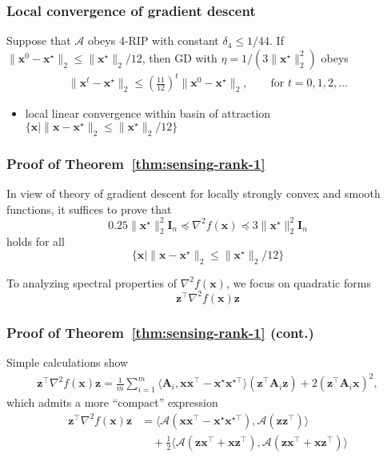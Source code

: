 \documentclass[compress,
mathserif,wide,%
]{beamer}
\begin{document}
\begin{frame}
	\frametitle{Local convergence of gradient descent}
	
	\begin{theorem}\label{thm:sensing-rank-1}
		Suppose that $\mathcal{A}$ obeys 4-RIP with constant $\delta_{4} \leq 1 /44$. If $\| \bm{x}^0 - \bm{x}^\star \|_{2} \leq \|\bm{x}^\star\|_{2} / 12$, then GD with $\eta = 1 / (3 \|\bm{x}^\star\|_{2}^{2})$ obeys
		\begin{align*}
			\| \bm{x}^t - \bm{x}^\star \|_2 \leq (\tfrac{11}{12})^t \| \bm{x}^0 - \bm{x}^\star \|_2, \qquad \text{for }t=0,1,2,\ldots
		\end{align*}
	\end{theorem}

	\vfill
	\begin{itemize}
		\item local linear convergence within basin of attraction $\{\bm{x} \mid \| \bm{x} - \bm{x}^\star \|_{2} \leq \|\bm{x}^\star\|_{2} / 12\}$
	\end{itemize}
\end{frame}

\begin{frame}
	\frametitle{Proof of Theorem~\ref{thm:sensing-rank-1}}
	In view of theory of gradient descent for locally strongly convex and smooth functions, it suffices to prove that 
	\[
		0.25 \|\bm{x}^\star\|_{2}^{2} \bm{I}_{n} \preceq \nabla^2 f (\bm{x}) \preceq 3 \|\bm{x}^\star\|_{2}^{2} \bm{I}_{n}
	\]
	holds for all 
	\[
	\{\bm{x} \mid \| \bm{x} - \bm{x}^\star \|_{2} \leq \|\bm{x}^\star\|_{2} / 12\}
	\]

	To analyzing spectral properties of $\nabla^2 f (\bm{x})$, we focus on quadratic forms
	\[
	\bm{z}^\top  \nabla^2 f (\bm{x}) \bm{z} 
	\]
\end{frame}

\begin{frame}
	\frametitle{Proof of Theorem~\ref{thm:sensing-rank-1} (cont.)}
	Simple calculations show
	\begin{align*}
		\bm{z}^\top  \nabla^2 f (\bm{x}) \bm{z} = \frac{1}{m} \sum_{i=1}^{m} \langle \bm{A}_{i}, \bm{x} \bm{x}^\top  - \bm{x}^{\star} \bm{x}^{\star \top} \rangle (\bm{z}^\top  \bm{A}_{i} \bm{z} ) + 2 (\bm{z}^\top  \bm{A}_{i} \bm{x} )^2,
	\end{align*}
	which admits a more ``compact'' expression
	\begin{align*}
		\bm{z}^\top  \nabla^2 f (\bm{x}) \bm{z} &= \langle \mathcal{A} (\bm{x} \bm{x}^\top  - \bm{x}^{\star} \bm{x}^{\star \top}), \mathcal{A} (\bm{z} \bm{z}^\top ) \rangle \\
		&\quad + \frac{1}{2} \langle \mathcal{A} (\bm{z} \bm{x}^\top  + \bm{x} \bm{z}^{\top}), \mathcal{A} (\bm{z} \bm{x}^\top  + \bm{x} \bm{z}^{\top}) \rangle 
	\end{align*}
\end{frame}
\end{document}
